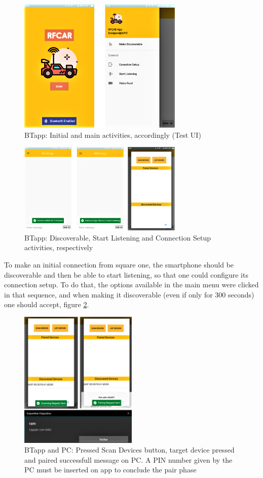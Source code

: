 %
\begin{figure}[!ht]
\centering
\includegraphics[width=0.7\textwidth]{img/bt_intro_main.png}
\caption{\label{fig:bt_intro_main}BTapp: Initial and main activities, accordingly (Test UI)}
\end{figure}
%
\begin{figure}[!ht]
\centering
\includegraphics[width=0.7\textwidth]{img/bt_disc_list_setup.png}
\caption{\label{fig:bt_disc_list_setup}BTapp: Discoverable, Start Listening and Connection Setup activities, respectively}
\end{figure}
%
To make an initial connection from square one, the smartphone should be discoverable and then be able to start listening, so that one could configure its connection setup. To do that, the options available in the main menu were clicked in that sequence, and when making it discoverable (even if only for 300 seconds) one should accept, figure \ref{fig:bt_disc_list_setup}.
%
\begin{figure}[!ht]
\centering
\includegraphics[width=0.5\textwidth]{img/bt_con_scan_pair_suc.png}
\caption{\label{fig:bt_con_scan_pair_suc}BTapp and PC: Pressed Scan Devices button, target device pressed and paired successfull message on PC. A PIN number given by the PC must be inserted on app to conclude the pair phase}
\end{figure}
